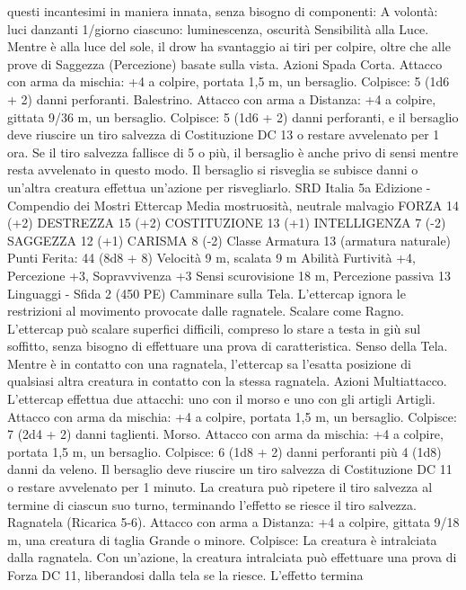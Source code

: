 \begin{multicols}{2}
questi incantesimi in maniera innata, senza bisogno di
componenti:
A volontà: luci danzanti
1/giorno ciascuno: luminescenza, oscurità
Sensibilità alla Luce. Mentre è alla luce del sole, il drow ha
svantaggio ai tiri per colpire, oltre che alle prove di Saggezza
(Percezione) basate sulla vista.
Azioni
Spada Corta. Attacco con arma da mischia: +4 a colpire, portata
1,5 m, un bersaglio.
Colpisce: 5 (1d6 + 2) danni perforanti.
Balestrino. Attacco con arma a Distanza: +4 a colpire, gittata
9/36 m, un bersaglio.
Colpisce: 5 (1d6 + 2) danni perforanti, e il bersaglio deve
riuscire un tiro salvezza di Costituzione DC 13 o restare
avvelenato per 1 ora. Se il tiro salvezza fallisce di 5 o più, il
bersaglio è anche privo di sensi mentre resta avvelenato in questo
modo. Il bersaglio si risveglia se subisce danni o un’altra
creatura effettua un’azione per risvegliarlo.
SRD Italia 5a Edizione - Compendio dei Mostri
Ettercap
Media mostruosità, neutrale malvagio
FORZA 14 (+2)
DESTREZZA 15 (+2)
COSTITUZIONE 13 (+1)
INTELLIGENZA 7 (-2)
SAGGEZZA 12 (+1)
CARISMA 8 (-2)
Classe Armatura 13 (armatura naturale)
\hspace*{0pt}\hfill{Punti Ferita}: 44 (8d8 + 8)
Velocità 9 m, scalata 9 m
Abilità Furtività +4, Percezione +3, Sopravvivenza +3
Sensi scurovisione 18 m, Percezione passiva 13
Linguaggi -
Sfida 2 (450 PE)
Camminare sulla Tela. L’ettercap ignora le restrizioni al
movimento provocate dalle ragnatele.
Scalare come Ragno. L’ettercap può scalare superfici difficili,
compreso lo stare a testa in giù sul soffitto, senza bisogno di
effettuare una prova di caratteristica.
Senso della Tela. Mentre è in contatto con una ragnatela,
l’ettercap sa l’esatta posizione di qualsiasi altra creatura in
contatto con la stessa ragnatela.
Azioni
Multiattacco. L’ettercap effettua due attacchi: uno con il morso e
uno con gli artigli
Artigli. Attacco con arma da mischia: +4 a colpire, portata 1,5
m, un bersaglio.
Colpisce: 7 (2d4 + 2) danni taglienti.
Morso. Attacco con arma da mischia: +4 a colpire, portata 1,5
m, un bersaglio.
Colpisce: 6 (1d8 + 2) danni perforanti più 4 (1d8) danni da
veleno. Il bersaglio deve riuscire un tiro salvezza di Costituzione
DC 11 o restare avvelenato per 1 minuto. La creatura può
ripetere il tiro salvezza al termine di ciascun suo turno,
terminando l’effetto se riesce il tiro salvezza.
Ragnatela (Ricarica 5-6). Attacco con arma a Distanza: +4 a
colpire, gittata 9/18 m, una creatura di taglia Grande o minore.
Colpisce: La creatura è intralciata dalla ragnatela. Con
un’azione, la creatura intralciata può effettuare una prova di
Forza DC 11, liberandosi dalla tela se la riesce. L’effetto termina

\end{multicols}
